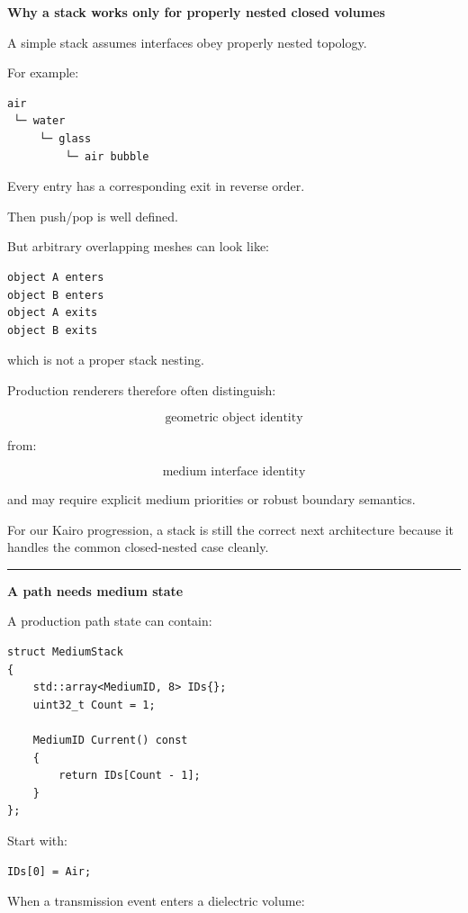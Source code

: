 \textbf{Why a stack works only for properly nested closed volumes}

A simple stack assumes interfaces obey properly nested topology.

For example:

\begin{verbatim}
air
 └─ water
     └─ glass
         └─ air bubble
\end{verbatim}

Every entry has a corresponding exit in reverse order.

Then push/pop is well defined.

But arbitrary overlapping meshes can look like:

\begin{verbatim}
object A enters
object B enters
object A exits
object B exits
\end{verbatim}

which is not a proper stack nesting.

Production renderers therefore often distinguish:

\[
\text{geometric object identity}
\]

from:

\[
\text{medium interface identity}
\]

and may require explicit medium priorities or robust boundary semantics.

For our Kairo progression, a stack is still the correct next architecture because it handles the common closed-nested case cleanly.

\begin{center}\rule{0.5\linewidth}{0.5pt}\end{center}

\textbf{A path needs medium state}

A production path state can contain:

\begin{verbatim}
struct MediumStack
{
    std::array<MediumID, 8> IDs{};
    uint32_t Count = 1;

    MediumID Current() const
    {
        return IDs[Count - 1];
    }
};
\end{verbatim}

Start with:

\begin{verbatim}
IDs[0] = Air;
\end{verbatim}

When a transmission event enters a dielectric volume:

